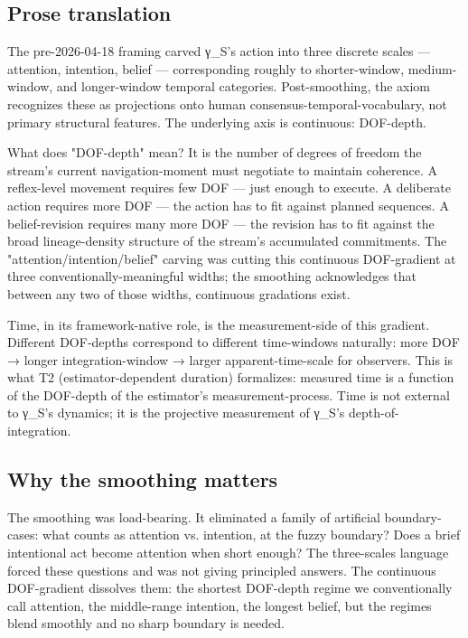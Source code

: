 \documentclass[11pt, openany]{book}
\begin{document}
\subsection{Prose translation}

The pre-2026-04-18 framing carved γ\_\allowbreak{}S's action into three discrete scales --- attention, intention, belief --- corresponding roughly to shorter-window, medium-window, and longer-window temporal categories. Post-smoothing, the axiom recognizes these as projections onto human consensus-temporal-vocabulary, not primary structural features. The underlying axis is continuous: DOF-depth.

What does "DOF-depth" mean? It is the number of degrees of freedom the stream's current navigation-moment must negotiate to maintain coherence. A reflex-level movement requires few DOF --- just enough to execute. A deliberate action requires more DOF --- the action has to fit against planned sequences. A belief-revision requires many more DOF --- the revision has to fit against the broad lineage-density structure of the stream's accumulated commitments. The "attention/intention/belief" carving was cutting this continuous DOF-gradient at three conventionally-meaningful widths; the smoothing acknowledges that between any two of those widths, continuous gradations exist.

Time, in its framework-native role, is the measurement-side of this gradient. Different DOF-depths correspond to different time-windows naturally: more DOF → longer integration-window → larger apparent-time-scale for observers. This is what T2 (estimator-dependent duration) formalizes: measured time is a function of the DOF-depth of the estimator's measurement-process. Time is not external to γ\_\allowbreak{}S's dynamics; it is the projective measurement of γ\_\allowbreak{}S's depth-of-integration.

\subsection{Why the smoothing matters}

The smoothing was load-bearing. It eliminated a family of artificial boundary-cases: what counts as attention vs. intention, at the fuzzy boundary? Does a brief intentional act become attention when short enough? The three-scales language forced these questions and was not giving principled answers. The continuous DOF-gradient dissolves them: the shortest DOF-depth regime we conventionally call attention, the middle-range intention, the longest belief, but the regimes blend smoothly and no sharp boundary is needed.
\end{document}
